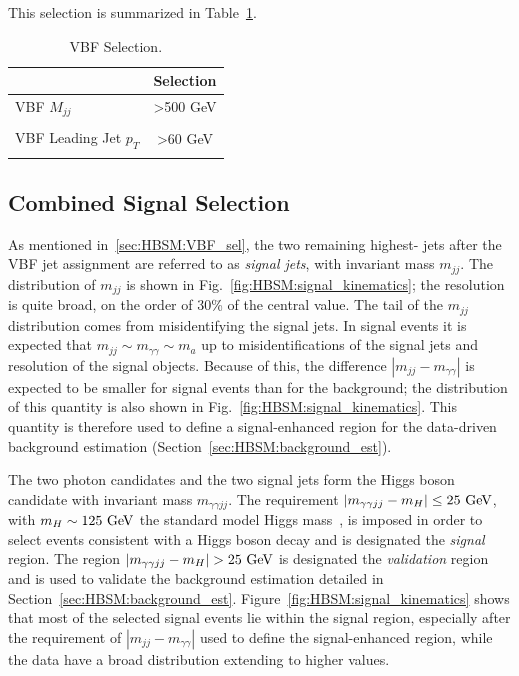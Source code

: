 This selection is summarized in Table~\ref{tab:HBSM:VBF_selection}.
\begin{table}[htbp]
  \begin{center}
  \caption{VBF Selection.}
  \label{tab:HBSM:VBF_selection}
    {\footnotesize
  \begin{tabular}{ l c }
    \toprule
    & Selection \\
    \midrule
    VBF $M_{jj}$ & >500 GeV \\
    \\
    VBF Leading Jet $p_T$  & >60 GeV \\
    \\ 
    \bottomrule
  \end{tabular}
    }
  \end{center}
\end{table}

\subsection{Combined Signal Selection}
\label{sec:HBSM:signal_selection}
As mentioned in~\ref{sec:HBSM:VBF_sel}, the two remaining highest-\pt{} jets after the VBF jet assignment are referred to as \textit{signal jets}, with invariant mass $m_{jj}$.
The distribution of $m_{jj}$ is shown in Fig.~\ref{fig:HBSM:signal_kinematics}; the resolution is quite broad, on the order of 30\% of the central value.
The tail of the $m_{jj}$ distribution comes from misidentifying the signal jets.
In signal events it is expected that $m_{jj}\sim m_{\gamma\gamma} \sim m_a$ up to misidentifications of the signal jets and resolution of the signal objects.
Because of this, the difference $|m_{jj}-m_{\gamma\gamma}|$ is expected to be smaller for signal events than for the background; the distribution of this quantity is also shown in Fig.~\ref{fig:HBSM:signal_kinematics}.
This quantity is therefore used to define a signal-enhanced region for the data-driven background estimation (Section~\ref{sec:HBSM:background_est}).

The two photon candidates and the two signal jets form the Higgs boson candidate with invariant mass $m_{\gamma\gamma jj}$.
The requirement $|m_{\gamma\gamma jj}-m_H| \le 25~\mathrm{GeV}{}$, with $m_H\sim125~\mathrm{GeV}{}$ the standard model Higgs mass~\cite{ref:TODO}, is imposed in order to select events consistent with a Higgs boson decay and is designated the \textit{signal} region.
The region $|m_{\gamma\gamma jj} - m_H| > 25~\mathrm{GeV}{}$ is designated the \textit{validation} region and is used to validate the background estimation detailed in Section~\ref{sec:HBSM:background_est}.
Figure~\ref{fig:HBSM:signal_kinematics} shows that most of the selected signal events lie within the signal region, especially after the requirement of $|m_{jj}-m_{\gamma\gamma}|$ used to define the signal-enhanced region,
while the data have a broad distribution extending to higher values.


